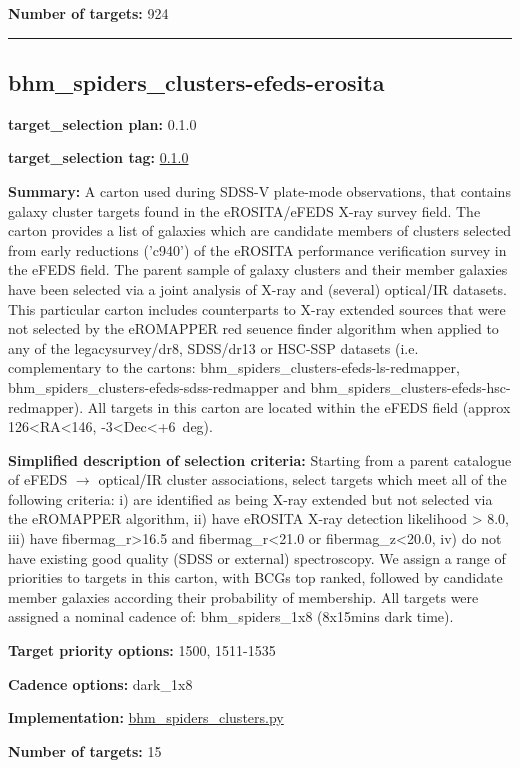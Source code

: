 \noindent\textbf{Number of targets:} 924

\begin{center}\rule{0.5\linewidth}{0.5pt}\end{center}

\hypertarget{bhm_spiders_clusters-efeds-erosita_plan0.1.0}{%
\subsection{bhm\_spiders\_clusters-efeds-erosita}\label{bhm_spiders_clusters-efeds-erosita_plan0.1.0}}

\noindent\textbf{target\_selection plan:} 0.1.0

\noindent\textbf{target\_selection tag:}
\href{https://github.com/sdss/target_selection/tree/0.1.0/}{0.1.0}

\noindent\textbf{Summary:} A carton used during SDSS-V plate-mode observations,
that contains galaxy cluster targets found in the eROSITA/eFEDS X-ray
survey field. The carton provides a list of galaxies which are candidate
members of clusters selected from early reductions ('c940') of the
eROSITA performance verification survey in the eFEDS field. The parent
sample of galaxy clusters and their member galaxies have been selected
via a joint analysis of X-ray and (several) optical/IR datasets. This
particular carton includes counterparts to X-ray extended sources that
were not selected by the eROMAPPER red seuence finder algorithm when
applied to any of the legacysurvey/dr8, SDSS/dr13 or HSC-SSP datasets
(i.e. complementary to the cartons:
bhm\_spiders\_clusters-efeds-ls-redmapper,
bhm\_spiders\_clusters-efeds-sdss-redmapper and
bhm\_spiders\_clusters-efeds-hsc-redmapper). All targets in this carton
are located within the eFEDS field (approx
126\textless{}RA\textless{}146, -3\textless{}Dec\textless{}+6~deg).

\noindent\textbf{Simplified description of selection criteria:} Starting from a
parent catalogue of eFEDS $\rightarrow$ optical/IR cluster associations, select
targets which meet all of the following criteria: i) are identified as
being X-ray extended but not selected via the eROMAPPER algorithm, ii)
have eROSITA X-ray detection likelihood \textgreater{} 8.0, iii) have
fibermag\_r\textgreater{}16.5 and fibermag\_r\textless{}21.0 or
fibermag\_z\textless{}20.0, iv) do not have existing good quality (SDSS
or external) spectroscopy. We assign a range of priorities to targets in
this carton, with BCGs top ranked, followed by candidate member galaxies
according their probability of membership. All targets were assigned a
nominal cadence of: bhm\_spiders\_1x8 (8x15mins dark time).


\noindent\textbf{Target priority options:} 1500, 1511-1535

\noindent\textbf{Cadence options:} dark\_1x8

\noindent\textbf{Implementation:}
\href{https://github.com/sdss/target_selection/blob/0.1.0/python/target_selection/cartons/bhm_spiders_clusters.py}{bhm\_spiders\_clusters.py}

\noindent\textbf{Number of targets:} 15
